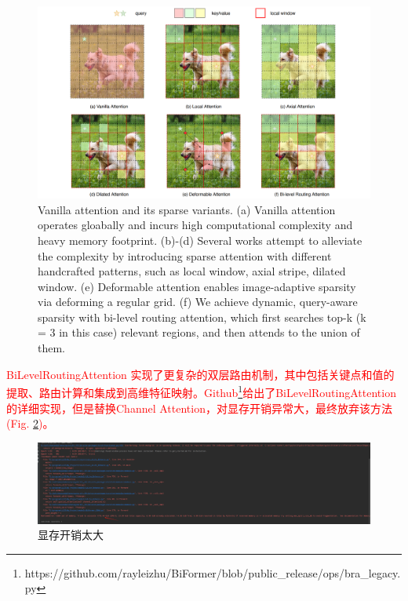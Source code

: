 \documentclass[a4paper]{ctexart}
\begin{document}
		\begin{figure}[htbp]
			\centering
			\includegraphics[width=0.8\linewidth]{picture/LLIE/Experiment/Vanilla attention}
			\caption{Vanilla attention and its sparse variants. (a) Vanilla attention operates gloabally and incurs high computational complexity and heavy memory footprint. (b)-(d) Several works attempt to alleviate the complexity by introducing sparse attention with different handcrafted patterns, such as local window, axial stripe, dilated window. (e) Deformable attention enables image-adaptive sparsity via deforming a regular grid. (f) We achieve dynamic, query-aware sparsity with bi-level routing attention, which first searches top-k (k = 3 in this case) relevant regions, and then attends to the union of them.}
			\label{fig: Vanilla attention}
		\end{figure}
		
		\textcolor{red}{BiLevelRoutingAttention 实现了更复杂的双层路由机制，其中包括关键点和值的提取、路由计算和集成到高维特征映射。Github\footnote{https://github.com/rayleizhu/BiFormer/blob/public\_release/ops/bra\_legacy.py}给出了BiLevelRoutingAttention的详细实现，但是替换Channel Attention，对显存开销异常大，最终放弃该方法(Fig. \ref{fig: BSAM Experiment})。}
		
		\begin{figure}[htbp]
			\centering
			\includegraphics[width=0.8\linewidth]{picture/LLIE/Experiment/BSAM experiment}
			\caption{显存开销太大}
			\label{fig: BSAM Experiment}
		\end{figure}
		
\end{document}
